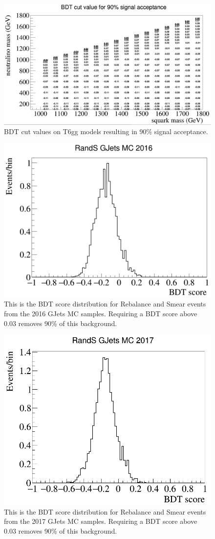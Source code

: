 \begin{figure}[h]
	\centering
	\includegraphics[width=1.5\linewidth, angle=90]{Figures/T6Wg_bdtcuts}
	\caption[BDT cut values on T6gg models resulting in 90\% signal acceptance.]{BDT cut values on T6gg models resulting in 90\% signal acceptance.}
	\label{fig:t6wgbdtcuts}
\end{figure}
\begin{figure}[h]
	\centering
	\includegraphics[width=0.7\linewidth]{Figures/GJets_BDT_2016}
	\caption[BDT response to Rebalance and Smear events in 2016 GJets MC]{This is the BDT score distribution for Rebalance and Smear events from the 2016 GJets MC samples. Requiring a BDT score above 0.03 removes 90\% of this background.}
	\label{fig:bdtgjets}
\end{figure}
\begin{figure}[h]
	\centering
	\includegraphics[width=0.7\linewidth]{Figures/GJets_BDT_2017}
	\caption[BDT response to Rebalance and Smear events in 2017 GJets MC]{This is the BDT score distribution for Rebalance and Smear events from the 2017 GJets MC samples. Requiring a BDT score above 0.03 removes 90\% of this background.}
	\label{fig:bdtgjets2017}
\end{figure}
